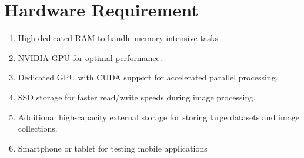 \section{Hardware Requirement}
\begin{enumerate}[noitemsep] %
   \item High dedicated RAM to handle memory-intensive tasks
   \item NVIDIA GPU for optimal performance.
   \item Dedicated GPU with CUDA support for accelerated parallel processing.
   \item  SSD storage for faster read/write speeds during image processing.
   \item Additional high-capacity external storage for storing large datasets and image collections.
   \item Smartphone or tablet for testing mobile applications  
\end{enumerate}
